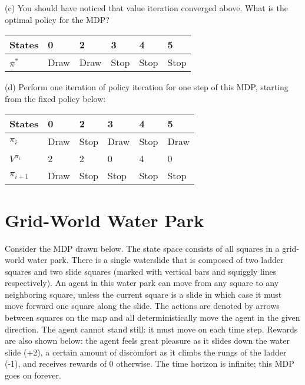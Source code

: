 \documentclass{article}
\begin{document}
\newpage

\noindent (c) You should have noticed that value iteration converged above. What is the optimal policy for the MDP?

\renewcommand\arraystretch{1.5}
\begin{table}[tbh!]
\begin{center}
    \begin{tabular}{|p{1cm}| p{1cm}| p{1cm} | p{1cm}| p{1cm}| p{1cm}|}
\hline 
States & 0 & 2 & 3 & 4 & 5  \\
\hline
$\pi^*$ & Draw  & Draw  & Stop  & Stop  & Stop   \\
\hline
\end{tabular}
\end{center}
\end{table}

\noindent (d) Perform one iteration of policy iteration for one step of this MDP, starting from the fixed policy below:

\renewcommand\arraystretch{1.5}
\begin{table}[tbh!]
\begin{center}
    \begin{tabular}{|p{1cm}| p{1cm}| p{1cm} | p{1cm}| p{1cm}| p{1cm}|}
\hline 
States & 0 & 2 & 3 & 4 & 5  \\
\hline
$\pi_i$ & Draw  & Stop  & Draw  & Stop  & Draw   \\
\hline
$V^{\pi_i}$ & 2  & 2  & 0  & 4  & 0   \\
\hline 
$\pi_{i+1}$ & Draw  & Stop  & Stop  & Stop  & Stop   \\
\hline
\end{tabular}
\end{center}
\end{table}

\newpage
\section{Grid-World Water Park}
\noindent Consider the MDP drawn below. The state space consists of all squares in a grid-world water park. There is a single waterslide that is composed of two ladder squares and two slide squares (marked with vertical bars and squiggly lines respectively). An agent in this water park can move from any square to any neighboring square, unless the current square is a slide in which case it must move forward one square along the slide. The actions are denoted by arrows between squares on the map and all deterministically move the agent in the given direction. The agent cannot stand still: it must move on each time step. Rewards are also shown below: the agent feels great pleasure as it slides down the water slide (+2), a certain amount of discomfort as it climbs the rungs of the ladder (-1), and receives rewards of 0 otherwise. The time horizon is infinite; this MDP goes on forever.
\end{document}
